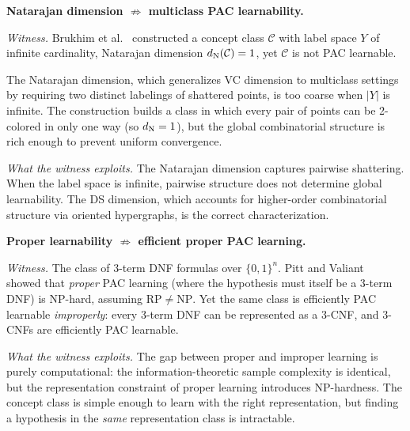 
\begin{separation}
\textbf{Natarajan dimension $\not\Rightarrow$ multiclass PAC
learnability.}

\medskip\noindent
\emph{Witness.}
Brukhim et al.~\cite{BrukhimCarmonDinurMoranYehudayoff2022}
constructed a concept class $\mathcal{C}$ with label space
$Y$ of infinite cardinality, Natarajan dimension $d_{\mathrm{N}}(\mathcal{C})=1$,
yet $\mathcal{C}$ is not PAC learnable.

The Natarajan dimension, which
generalizes VC dimension to multiclass settings by requiring two
distinct labelings of shattered points, is too coarse when $|Y|$ is
infinite. The construction builds a class in which every pair of points
can be 2-colored in only one way (so $d_{\mathrm{N}} = 1$), but the global
combinatorial structure is rich enough to prevent uniform convergence.

\medskip\noindent
\emph{What the witness exploits.}
The Natarajan dimension captures pairwise shattering. When the label
space is infinite, pairwise structure does not determine global
learnability. The DS dimension, which accounts for higher-order
combinatorial structure via oriented hypergraphs, is the correct
characterization.

\hfill\cite{BrukhimCarmonDinurMoranYehudayoff2022}
\end{separation}


\begin{separation}
\textbf{Proper learnability $\not\Rightarrow$ efficient proper PAC
learning.}

\medskip\noindent
\emph{Witness.}
The class of 3-term DNF formulas over $\{0,1\}^n$. Pitt and
Valiant~\cite{PittValiant1988} showed that \emph{proper} PAC
learning (where the hypothesis must
itself be a 3-term DNF) is NP-hard, assuming
$\mathrm{RP} \neq \mathrm{NP}$. Yet the same class
is efficiently PAC learnable \emph{improperly}: every 3-term DNF can be
represented as a 3-CNF, and 3-CNFs are efficiently PAC learnable.

\medskip\noindent
\emph{What the witness exploits.}
The gap between proper and improper learning is purely
computational: the information-theoretic sample complexity is
identical, but the representation constraint of proper learning
introduces NP-hardness. The concept class is simple enough to learn
with the right representation, but finding a hypothesis in the
\emph{same} representation class is intractable.

\hfill\cite{PittValiant1988}
\end{separation}

